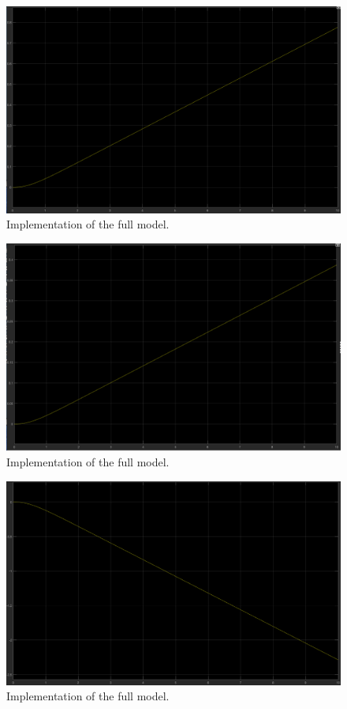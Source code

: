 \begin{figure}[H]
  \centering
    \includegraphics[width=1\textwidth]{images/Gx.png}
	\caption{Implementation of the full model.}
	\label{openloop2}
\end{figure}

\begin{figure}[H]
  \centering
    \includegraphics[width=1\textwidth]{images/Gy.png}
	\caption{Implementation of the full model.}
	\label{openloop3}
\end{figure}

\begin{figure}[H]
  \centering
    \includegraphics[width=1\textwidth]{images/Gz.png}
	\caption{Implementation of the full model.}
	\label{openloop4}
\end{figure}

